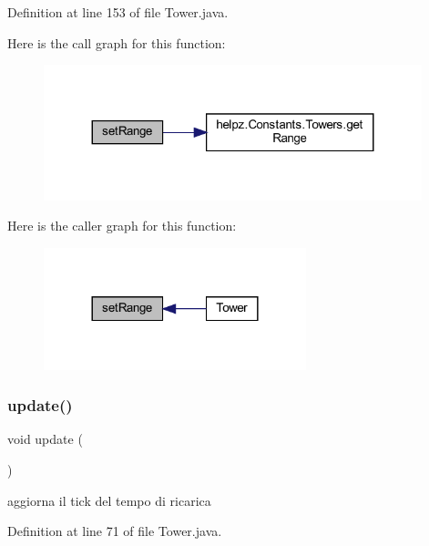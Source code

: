 Definition at line 153 of file Tower.\+java.

Here is the call graph for this function\+:\nopagebreak
\begin{figure}[H]
\begin{center}
\leavevmode
\includegraphics[width=311pt]{classtowers_1_1_tower_abfc55d980923d42001e5aefda77849f9_cgraph}
\end{center}
\end{figure}
Here is the caller graph for this function\+:\nopagebreak
\begin{figure}[H]
\begin{center}
\leavevmode
\includegraphics[width=216pt]{classtowers_1_1_tower_abfc55d980923d42001e5aefda77849f9_icgraph}
\end{center}
\end{figure}
\mbox{\label{classtowers_1_1_tower_ac5c54df7ed3b930268c8d7752c101725}} 
\subsubsection{\texorpdfstring{update()}{update()}}
{\footnotesize\ttfamily void update (\begin{DoxyParamCaption}{ }\end{DoxyParamCaption})}



aggiorna il tick del tempo di ricarica 



Definition at line 71 of file Tower.\+java.



